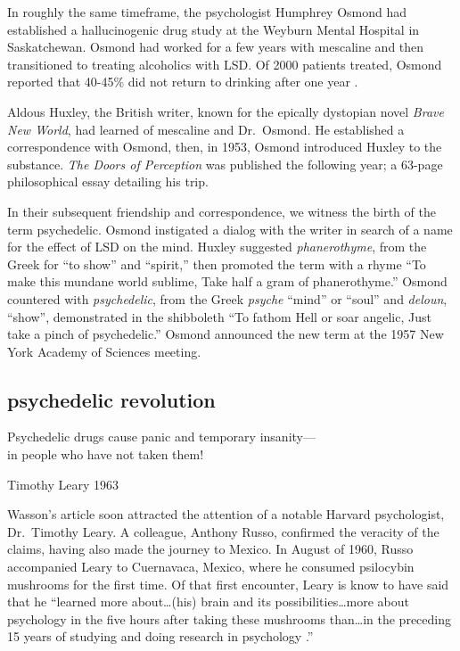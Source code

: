\documentclass{UIdahoMastersThesis}
\begin{document}
In roughly the same timeframe, the psychologist Humphrey Osmond had established a hallucinogenic drug study at the Weyburn Mental Hospital in Saskatchewan. Osmond had worked for a few years with mescaline and then transitioned to treating alcoholics with LSD. Of 2000 patients treated, Osmond reported that 40-45\% did not return to drinking after one year \cite{dyck_hitting_2006}.

Aldous Huxley, the British writer, known for the epically dystopian novel \emph{Brave New World}, had learned of mescaline and Dr.~Osmond. He established a correspondence with Osmond, then, in 1953, Osmond introduced Huxley to the substance. \emph{The Doors of Perception} was published the following year; a 63-page philosophical essay detailing his trip.

In their subsequent friendship and correspondence, we witness the birth of the term psychedelic. Osmond instigated a dialog with the writer in search of a name for the effect of LSD on the mind. Huxley suggested \emph{phanerothyme}, from the Greek for ``to show'' and ``spirit,'' then promoted the term with a rhyme \enquote{To make this mundane world sublime, Take half a gram of phanerothyme.} Osmond countered with \emph{psychedelic}, from the Greek \emph{psyche} ``mind'' or ``soul'' and \emph{deloun}, ``show'', demonstrated in the shibboleth \enquote{To fathom Hell or soar angelic, Just take a pinch of psychedelic.} Osmond announced the new term at the 1957 New York Academy of Sciences meeting. 


\subsection{psychedelic revolution}

\epigraph {Psychedelic drugs cause panic and temporary insanity---\\
in people who have not taken them!}{Timothy Leary 1963}

\vspace{9mm}

Wasson's article soon attracted the attention of a notable Harvard psychologist, Dr.~Timothy Leary. A colleague, Anthony Russo, confirmed the veracity of the claims, having also made the journey to Mexico. In August of 1960, Russo accompanied Leary to Cuernavaca, Mexico, where he consumed psilocybin mushrooms for the first time. Of that first encounter, Leary is know to have said that he \enquote{learned more about\ldots (his) brain and its possibilities\ldots more about psychology in the five hours after taking these mushrooms than\ldots in the preceding 15 years of studying and doing research in psychology \cite{dassfierce}.} 
\end{document}
